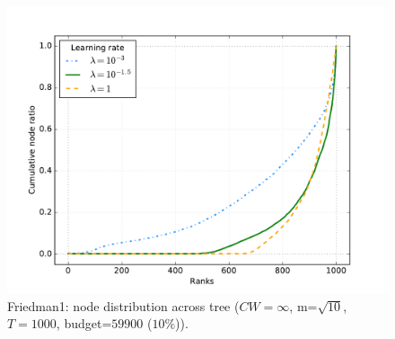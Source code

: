 \documentclass{article}
\begin{document}
\begin{figure}[ht]
\begin{center}
\centerline{\includegraphics[width=\columnwidth]{friedman1_cumul}}
\caption{Friedman1: node distribution across tree ($CW=\infty$, 
m=$\sqrt{10}$, $T=1000$, budget=$59900$ ($10\%$)).}
\label{fig:LRShape}
\end{center}
\vskip -0.2in
\end{figure} 

%
\end{document}

